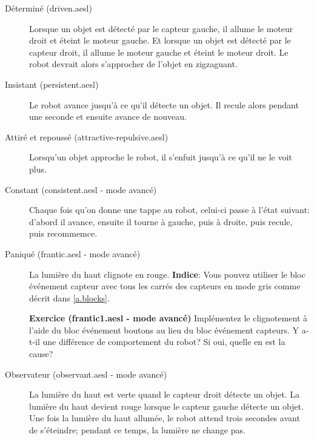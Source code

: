 \begin{description}
\item[Déterminé (driven.aesl)]
Lorsque un objet est détecté par le capteur gauche, il allume le moteur droit et éteint le moteur gauche.
Et lorsque un objet est détecté par le capteur droit, il allume le moteur gauche et éteint le moteur droit.
Le robot devrait alors s'approcher de l'objet en zigzaguant.

\item[Insistant (persistent.aesl)]
Le robot avance jusqu'à ce qu'il détecte un objet.
Il recule alors pendant une seconde et ensuite avance de nouveau.

\item[Attiré et repoussé (attractive-repulsive.aesl)]
Lorsqu'un objet approche le robot, il s'enfuit jusqu'à ce qu'il ne le voit plus.

\item[Constant (consistent.aesl - mode avancé)]
Chaque fois qu'on donne une tappe au robot, celui-ci passe à l'état suivant:
d'abord il avance, ensuite il tourne à gauche, puis à droite, puis recule, puis recommemce.


\item[Paniqué (frantic.aesl - mode avancé)]
La lumière du haut clignote en rouge.
\textbf{Indice}: Vous pouvez utiliser le bloc événement capteur avec tous les carrés des capteurs en mode gris comme décrit dans \cref{a.blocks}.

\textbf{Exercice (frantic1.aesl - mode avancé)}
Implémentez le clignotement à l'aide du bloc événement boutons au lieu du bloc événement capteurs.
Y a-t-il une différence de comportement du robot? Si oui, quelle en est la cause?

\item[Observateur (observant.aesl - mode avancé)]
La lumière du haut est verte quand le capteur droit détecte un objet.
La lumière du haut devient rouge lorsque le capteur gauche détecte un objet.
Une fois la lumière du haut allumée, le robot attend trois secondes avant de s'éteindre;
pendant ce temps, la lumière ne change pas.

\end{description}
